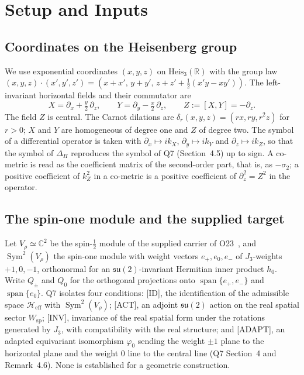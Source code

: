\documentclass[11pt,a4paper]{article}
\theoremstyle{definition}
\theoremstyle{remark}
\DeclareMathOperator{\Sym}{Sym}
\DeclareMathOperator{\spn}{span}
\newcommand{\heff}{\mathcal{H}_{\mathrm{eff}}}
\newcommand{\Vr}{V_{\rho}}
\newcommand{\Wsp}{W_{\mathrm{sp}}}
\newcommand{\suTwo}{\mathfrak{su}(2)}
\newcommand{\heisR}{\mathrm{Heis}_{3}(\mathbb{R})}
\newcommand{\sigmatwo}{\sigma_{2}}
\begin{document}
  \section{Setup and Inputs}\label{sec:setup}

    \subsection{Coordinates on the Heisenberg group}

      We use exponential coordinates $(x, y, z)$ on $\heisR$ with the group law
      $(x, y, z)\cdot(x', y', z') = (x + x',\, y + y',\, z + z' + \tfrac12(x'y - xy'))$.
      The left-invariant horizontal fields and their commutator are
      \begin{equation}\label{eq:fields}
        X = \partial_x + \tfrac{y}{2}\,\partial_z, \qquad
        Y = \partial_y - \tfrac{x}{2}\,\partial_z, \qquad
        Z := [X, Y] = -\partial_z .
      \end{equation}
      The field $Z$ is central.
      The Carnot dilations are $\delta_r(x, y, z) = (rx, ry, r^2 z)$ for $r > 0$; $X$ and $Y$ are homogeneous of
      degree one and $Z$ of degree two.
      The symbol of a differential operator is taken with $\partial_x \mapsto i k_X$, $\partial_y \mapsto i k_Y$ and
      $\partial_z \mapsto i k_Z$, so that the symbol of $\Delta_H$ reproduces the symbol of Q7 (Section~4.5)
      up to sign.
      A co-metric is read as the coefficient matrix of the second-order part, that is, as $-\sigmatwo$; a positive
      coefficient of $k_Z^2$ in a co-metric is a positive coefficient of $\partial_z^2 = Z^2$ in the operator.

    \subsection{The spin-one module and the supplied target}

      Let $\Vr \simeq \mathbb{C}^2$ be the spin-$\frac12$ module of the supplied carrier of O23~\cite{Beau2026a27},
      and $\Sym^2(\Vr)$ the spin-one module with weight vectors $e_+, e_0, e_-$ of $J_3$-weights $+1, 0, -1$,
      orthonormal for an $\suTwo$-invariant Hermitian inner product $h_0$.
      Write $Q_\pm$ and $Q_0$ for the orthogonal projections onto $\spn\{e_+, e_-\}$ and $\spn\{e_0\}$.
      Q7 isolates four conditions: [ID], the identification of the admissible space $\heff$ with $\Sym^2(\Vr)$;
      [ACT], an adjoint $\suTwo$ action on the real spatial sector $\Wsp$; [INV], invariance of the real spatial form
      under the rotations generated by $J_3$, with compatibility with the real structure; and [ADAPT], an adapted
      equivariant isomorphism $\varphi_0$ sending the weight $\pm 1$ plane to the horizontal plane and the weight $0$
      line to the central line (Q7 Section~4 and Remark~4.6).
      None is established for a geometric construction.
\end{document}
